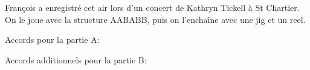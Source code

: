 François a enregistré cet air lors d'un concert de Kathryn Tickell à St
Chartier. On le joue avec la structure AABABB, puis on l'enchaîne avec une jig
et un reel.

Accords pour la partie A:


Accords additionnels pour la partie B:


\tune

